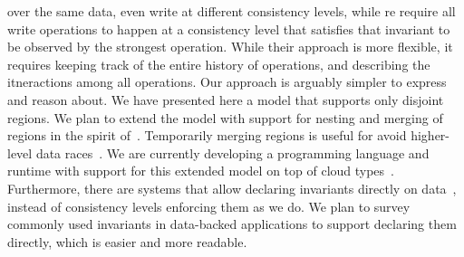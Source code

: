 \documentclass[preprint,numbers]{sigplanconf}
\begin{document}
over the same data, even write at different consistency levels, while re require 
all write operations to happen at a consistency level that satisfies that
invariant to be observed by the strongest operation. While their approach is
more flexible, it requires keeping track of the entire history of operations,
and describing the itneractions among all operations. Our approach is arguably
simpler to express and reason about. 
\label{sec:conclusion}
We have presented here a model that supports only disjoint regions. We plan to
extend the model with support 
for 
nesting and merging of regions in the spirit of~\cite{dolby2012data}.
Temporarily merging regions is useful for
avoid higher-level data races~\cite{artho2003high}. We are
currently developing a programming language and runtime with support for this extended model
on top of cloud types~\cite{burckhardt2012cloud}. Furthermore, there are systems
that allow declaring invariants directly on data~\cite{bailis2015feral}, instead of 
consistency levels enforcing them as we do. We plan to survey commonly used
invariants in data-backed applications to support declaring them directly, which
is easier and more readable.








\end{document}
